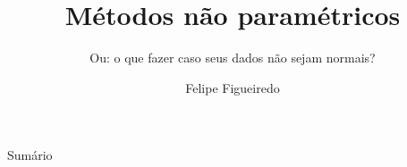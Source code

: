 \documentclass{beamer}
\title%
{Métodos não paramétricos}
\subtitle
{Ou: o que fazer caso seus dados não sejam normais?} %
\author%
{Felipe Figueiredo}%
\institute[INTO] %
{Instituto Nacional de Traumatologia e Ortopedia
}
\date%
{}
\begin{document}
\begin{frame}
  \titlepage
\end{frame}

\begin{frame}{Sumário}
  \tableofcontents
\end{frame}








\end{document}
